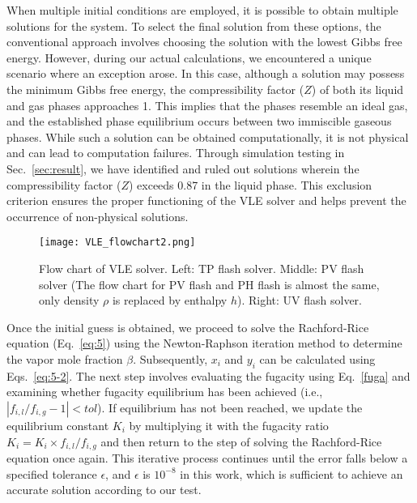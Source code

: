 {When multiple initial conditions are employed, it is possible to obtain multiple solutions for the system. To select the final solution from these options, the conventional approach involves choosing the solution with the lowest Gibbs free energy. However, during our actual calculations, we encountered a unique scenario where an exception arose. In this case, although a solution may possess the minimum Gibbs free energy, the compressibility factor ($Z$) of both its liquid and gas phases approaches 1. This implies that the phases resemble an ideal gas, and the established phase equilibrium occurs between two immiscible gaseous phases. While such a solution can be obtained computationally, it is not physical and can lead to computation failures. Through simulation testing in Sec.~\ref{sec:result}, we have identified and ruled out solutions wherein the compressibility factor ($Z$) exceeds 0.87 in the liquid phase. This exclusion criterion ensures the proper functioning of the VLE solver and helps prevent the occurrence of non-physical solutions. }

\begin{figure}[htbp]
\centering
\texttt{[image: VLE\_flowchart2.png]}
\caption{Flow chart of VLE solver. Left: TP flash solver. Middle: PV flash solver (The flow chart for PV flash and PH flash is almost the same, only density $\rho$ is replaced by enthalpy $h$). Right: UV flash solver.}
\label{FC} 
\end{figure}

Once the initial guess is obtained, we proceed to solve the Rachford-Rice equation (Eq.~\ref{eq:5}) using the Newton-Raphson iteration method to determine the vapor mole fraction $\beta$. Subsequently, $x_i$ and $y_i$ can be calculated using Eqs.~\ref{eq:5-2}. The next step involves evaluating the fugacity using Eq.~\ref{fuga} and examining whether fugacity equilibrium has been achieved (i.e., $\left|f_{i,l}/f_{i,g}-1\right| < tol $). If equilibrium has not been reached, we update the equilibrium constant $K_i$ by multiplying it with the fugacity ratio $K_i=K_i \times f_{i,l}/f_{i,g}$ and then return to the step of solving the Rachford-Rice equation once again. This iterative process continues until the error falls below a specified tolerance $\epsilon$, and $\epsilon$ is $10^{-8}$ in this work, which is sufficient to achieve an accurate solution according to our test. 


